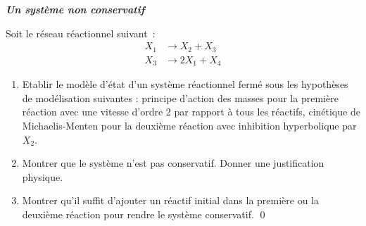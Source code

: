 \begin{exercice}{\bf \em Un système non conservatif}

Soit le réseau réactionnel suivant~:
\begin{equation*} \begin{split} 
X_1   &\longrightarrow X_2 + X_3 \\
X_3 &\longrightarrow 2X_1 + X_4
\end{split} \end{equation*}
\begin{enumerate}
\item Etablir le modèle d'état d'un système réactionnel fermé
sous les hypothèses de modélisation suivantes : principe d'action des
masses pour la première réaction avec une vitesse d'ordre 2
par rapport à tous les réactifs, cinétique de Michaelis-Menten pour
la deuxième réaction avec inhibition hyperbolique par $X_2$.
\item Montrer que le système n'est pas conservatif. Donner une
justification physique.
\item Montrer qu'il suffit d'ajouter un réactif initial dans la première 
ou la deuxième réaction pour rendre le système conservatif. \qed
\end{enumerate}
\end{exercice}


  

